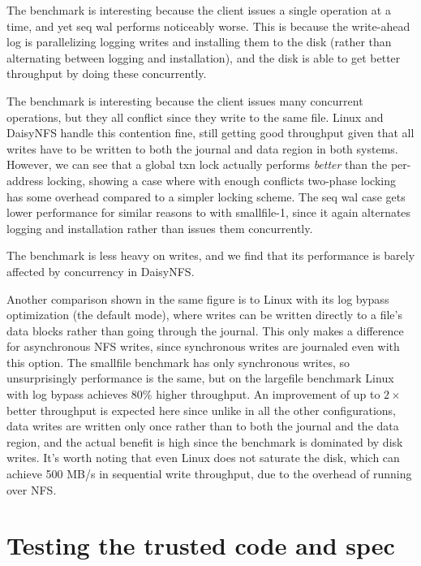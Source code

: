 The  benchmark is interesting because the client issues a single
operation at a time, and yet seq wal performs noticeably worse. This is because
the write-ahead log is parallelizing logging writes and installing them to the
disk (rather than alternating between logging and installation), and the disk is
able to get better throughput by doing these concurrently.

The  benchmark is interesting because the client issues many
concurrent operations, but they all conflict since they write to the same file.
Linux and DaisyNFS handle this contention fine, still getting good throughput
given that all writes have to be written to both the journal and data region in
both systems. However, we can see that a global txn lock actually performs
\emph{better} than the per-address locking, showing a case where with enough
conflicts two-phase locking has some overhead compared to a simpler locking
scheme. The seq wal case gets lower performance for similar reasons to with
smallfile-1, since it again alternates logging and installation rather than
issues them concurrently.

The  benchmark is less heavy on writes, and we find that its performance
is barely affected by concurrency in DaisyNFS.

Another comparison shown in the same figure is to Linux with its log bypass
optimization (the default  mode), where writes can be written
directly to a file's data blocks rather than going through the journal. This
only makes a difference for asynchronous NFS writes, since synchronous writes
are journaled even with this option. The smallfile benchmark has only
synchronous writes, so unsurprisingly performance is the same, but on the
largefile benchmark Linux with log bypass achieves 80\% higher throughput. An
improvement of up to $2\times$ better throughput is expected here since unlike
in all the other configurations, data writes are written only once rather than
to both the journal and the data region, and the actual benefit is high since
the benchmark is dominated by disk writes. It's worth noting that even Linux
does not saturate the disk, which can achieve 500 MB/s in sequential write
throughput, due to the overhead of running over NFS.

\section{Testing the trusted code and spec}
\label{sec:eval:testing}

